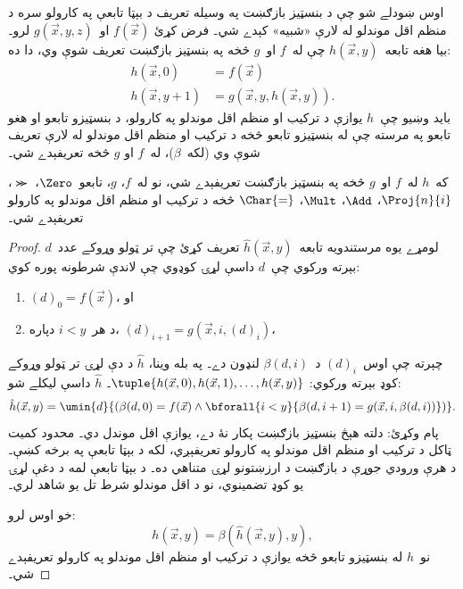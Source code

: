 \documentclass[../../../include/open-logic-section]{subfiles}
\begin{document}

اوس ښودلے شو چې د بنسټيز بازګښت په وسيله تعريف د بېټا تابعې په
کارولو سره د منظم اقل موندلو له لارې «شبيه» کېدے شي۔ فرض کړئ
$f(\vec x)$ او~$g(\vec x, y, z)$ لرو۔ بيا هغه تابعه~$h(\vec x,y)$
چې له~$f$ او~$g$ څخه په بنسټيز بازګښت تعريف شوې وي، دا ده:
\begin{align*}
h(\vec x, 0) & =  f(\vec x) \\
h(\vec x, y+1) & =  g(\vec x, y, h(\vec x, y)).
\end{align*}
بايد وښيو چې~$h$ يوازې د ترکيب او منظم اقل موندلو په کارولو، د
بنسټيزو تابعو او هغو تابعو په مرسته چې له بنسټيزو تابعو څخه د ترکيب
او منظم اقل موندلو له لارې تعريف شوې وي (لکه~$\beta$)، له~$f$ او
$g$ څخه تعريفېدے شي۔

\begin{lem}
که~$h$ له~$f$ او~$g$ څخه په بنسټيز بازګښت تعريفېدے شي، نو له~$f$،
$g$، تابعو~$\Zero$، $\Succ$، $\Proj{n}{i}$، $\Add$، $\Mult$،
$\Char{=}$ څخه د ترکيب او منظم اقل موندلو په کارولو تعريفېدے شي۔
\end{lem}

\begin{proof}
لومړے يوه مرستندويه تابعه~$\hat h(\vec x, y)$ تعريف کړئ چې تر ټولو
وړوکے عدد~$d$ بېرته ورکوي چې~$d$ داسې لړۍ کوډوي چې لاندې شرطونه پوره
کوي:
\begin{enumerate}
\item $(d)_0 = f(\vec x)$، او
\item د هر~$i < y$ دپاره، $(d)_{i+1} = g(\vec x, i, (d)_i)$،
\end{enumerate}
چېرته چې اوس~$(d)_i$ د~$\beta(d,i)$ لنډون دے۔ په بله وينا،
$\hat h$ د دې لړۍ تر ټولو وړوکے کوډ بېرته ورکوي:
$\tuple{h(\vec x, 0), h(\vec x, 1), \dots, h(\vec x, y)}$۔
$\hat h$ داسې ليکلے شو:
\[
\hat h(\vec x, y) = \umin{d}{(\beta(d,0) = f(\vec x) \land \bforall{i <
  y}{\beta(d,i+1) = g(\vec x, i,\beta(d,i))})}.
\]
پام وکړئ: دلته هېڅ بنسټيز بازګښت پکار نۀ دے، يوازې اقل موندل دي۔
محدود کميت ټاکل د ترکيب او منظم اقل موندلو په کارولو تعريفېږي، لکه د بېټا تابعې په برخه کښې۔ د هرې ورودي جوړې د بازګښت د ارزښتونو لړۍ متناهي ده۔ د بېټا تابعې لمه  د دغې لړۍ يو کوډ تضمينوي، نو د اقل موندلو شرط تل يو شاهد لري۔

خو اوس لرو:
\[
h(\vec x, y) = \beta(\hat h(\vec x, y), y),
\]
نو~$h$ له بنسټيزو تابعو څخه يوازې د ترکيب او منظم اقل موندلو په
کارولو تعريفېدے شي۔
\end{proof}
\end{document}
